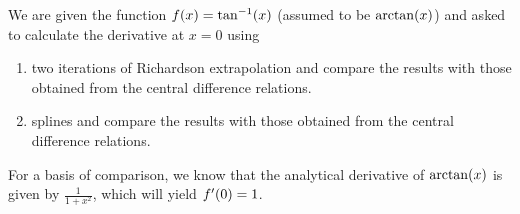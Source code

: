 \documentclass[12pt]{article}
\newenvironment{sol}[1][Solution]{\begin{trivlist}
\item[\hskip \labelsep {\bfseries #1:}]}{\end{trivlist}}
\DeclarePairedDelimiter\rb{(}{)}
\begin{document}
We are given the function \(f\rb*{x}  = \tan ^{-1} \rb*{x} \) (assumed to be \( \arctan \rb*{x}  \)) and asked to calculate the derivative at \(x = 0\) using 

\begin{enumerate}[label=(\alph*)]
	\item two iterations of Richardson extrapolation and compare the results with those obtained from the central difference relations.
	\item splines and compare the results with those obtained from the central difference relations.
\end{enumerate}

\begin{sol}  \end{sol}

For a basis of comparison, we know that the analytical derivative of \(\arctan \rb*{x} \) is given by \(\frac{1}{1 + x^{2}}\), which will yield \(f'\rb*{0} = 1\).
\end{document}
